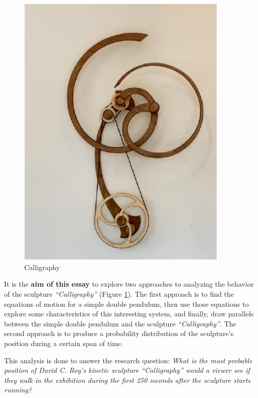 \documentclass[a4paper,12pt]{article}
\begin{document}
\begin{figure}[H]
\begin{minipage}{0.45\textwidth}
            \includegraphics[width=0.9\textwidth]{calli} %
            \caption{Calligraphy}
            \label{fig:calli}
        \end{minipage}
    \end{figure}

    It is the \textbf{aim of this essay} to explore two approaches to analyzing the behavior of the sculpture \textit{“Calligraphy”} (Figure \ref{fig:calli}). The first approach is to find the equations of motion for a simple double pendulum, then use those equations to explore some characteristics of this interesting system, and finally, draw parallels between the simple double pendulum and the sculpture \textit{“Calligraphy”}. The second approach is to produce a probability distribution of the sculpture’s position during a certain span of time. 
    
    This analysis is done to answer the 
    research question: \textit{What is the most probable position of David C. Roy’s kinetic sculpture \textit{“Calligraphy”} would a viewer see if they walk in the exhibition during the first 250 seconds after the sculpture starts running?}
\end{document}
